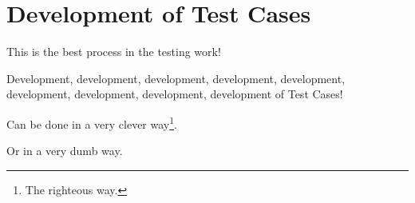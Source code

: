 \section{Development of Test Cases}
\label{sec:Development of Test Cases}

This is the best process in the testing work! 

Development, development, development, development, development, development, development, development, development of Test Cases!

Can be done in a very clever way\footnote{The righteous way.}.

Or in a very dumb way.